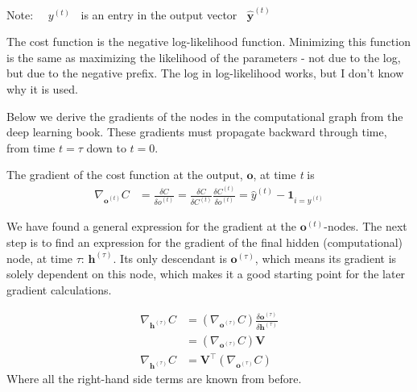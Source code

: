 \documentclass[12pt]{article}
\begin{document}
Note: $\quad y^{(t)} \;\;$ is an entry in the output vector $\;\; \mathbf{\hat{y}}^{(t)}$ \par
The cost function is the negative log-likelihood function. Minimizing this function is the same as maximizing the likelihood of the parameters - not due to the log, but due to the negative prefix. The log in log-likelihood works, but I don't know why it is used. \par
Below we derive the gradients of the nodes in the computational graph from the deep learning book. These gradients must propagate backward through time, from time $t=\tau$ down to $t=0$.
\par
The gradient of the cost function at the output, $\mathbf{o}$, at time \textit{t} is
\begin{align}
    \nabla_{\mathbf{o}^{(t)}} C &= \frac{\delta C}{\delta o^{(t)}}
    = \frac{\delta C}{\delta C^{(t)}}\frac{\delta C^{(t)}}{\delta o^{(t)}}
    = \hat{y}^{(t)} - \mathbf{1}_{i=y^{(t)}}
\end{align}

We have found a general expression for the gradient at the $\mathbf{o}^{(t)}$-nodes. The next step is to find an expression for the gradient of the final hidden (computational) node, at time $\tau$: $\mathbf{h}^{(\tau)}$. Its only descendant is $\mathbf{o}^{(\tau)}$, which means its gradient is solely dependent on this node, which makes it a good starting point for the later gradient calculations.

\begin{align}
    \nabla_{\mathbf{h}^{(\tau)}} C &= \left(\nabla_{\mathbf{o}^{(\tau)}}C\right) \frac{\delta \mathbf{o}^{(\tau)}}{\delta \mathbf{h}^{(\tau)}}\\
    &= \left(\nabla_{\mathbf{o}^{(\tau)}}C\right) \mathbf{V}\\
    \nabla_{\mathbf{h}^{(\tau)}} C &= \mathbf{V}^{\top} \left(\nabla_{\mathbf{o}^{(\tau)}}C\right)
\end{align}
Where all the right-hand side terms are known from before. \par
\end{document}
